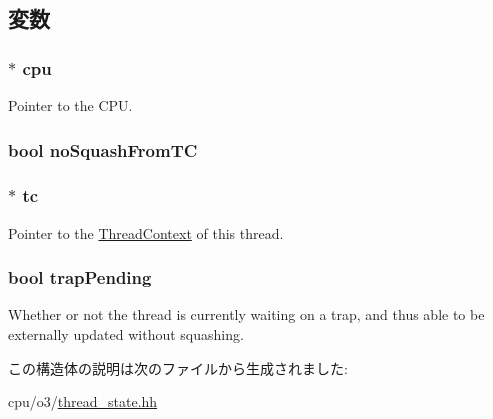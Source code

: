 \subsection{変数}
\hypertarget{structO3ThreadState_a1379cf882a12ac6fc9eba5da7c84b18b}{
\subsubsection[{cpu}]{$\ast$ {\bf cpu}}}
\label{structO3ThreadState_a1379cf882a12ac6fc9eba5da7c84b18b}
Pointer to the CPU. \hypertarget{structO3ThreadState_afdfc33b720511483d84f7098ab6ba075}{
\subsubsection[{noSquashFromTC}]{\setlength{\rightskip}{0pt plus 5cm}bool {\bf noSquashFromTC}}}
\label{structO3ThreadState_afdfc33b720511483d84f7098ab6ba075}
\hypertarget{structO3ThreadState_a4455a4759e69e5ebe68ae7298cbcc37d}{
\subsubsection[{tc}]{$\ast$ {\bf tc}}}
\label{structO3ThreadState_a4455a4759e69e5ebe68ae7298cbcc37d}
Pointer to the \hyperlink{classThreadContext}{ThreadContext} of this thread. \hypertarget{structO3ThreadState_aa9f948437524f88e51afd737df505200}{
\subsubsection[{trapPending}]{\setlength{\rightskip}{0pt plus 5cm}bool {\bf trapPending}}}
\label{structO3ThreadState_aa9f948437524f88e51afd737df505200}
Whether or not the thread is currently waiting on a trap, and thus able to be externally updated without squashing. 

この構造体の説明は次のファイルから生成されました:\begin{DoxyCompactItemize}
\item 
cpu/o3/\hyperlink{o3_2thread__state_8hh}{thread\_\-state.hh}\end{DoxyCompactItemize}
